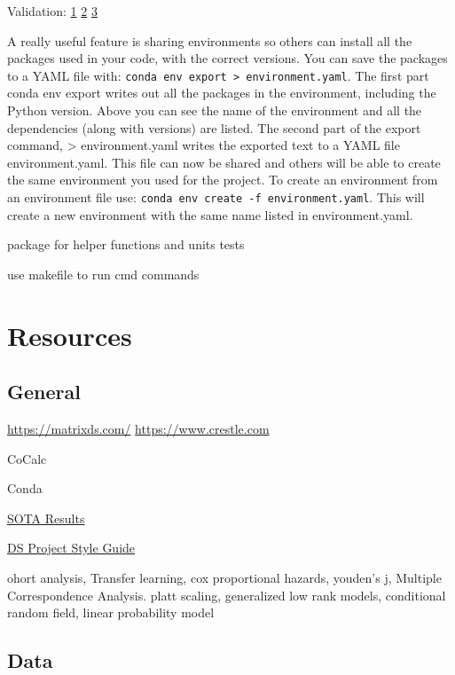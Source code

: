 \documentclass[]{book}
\begin{document}
Validation: \href{https://github.com/data-cleaning/validate}{1}
\textbar{} \href{https://rdrr.io/cran/checkmate/}{2} \textbar{}
\href{https://github.com/shawnbrown/datatest}{3}

A really useful feature is sharing environments so others can install
all the packages used in your code, with the correct versions. You can
save the packages to a YAML file with:
\texttt{conda\ env\ export\ \textgreater{}\ environment.yaml}. The first
part conda env export writes out all the packages in the environment,
including the Python version. Above you can see the name of the
environment and all the dependencies (along with versions) are listed.
The second part of the export command, \textgreater{} environment.yaml
writes the exported text to a YAML file environment.yaml. This file can
now be shared and others will be able to create the same environment you
used for the project. To create an environment from an environment file
use: \texttt{conda\ env\ create\ -f\ environment.yaml}. This will create
a new environment with the same name listed in environment.yaml.

package for helper functions and units tests

use makefile to run cmd commands

\section{Resources}\label{resources}

\subsection{General}\label{general}

\url{https://matrixds.com/} \textbar{} \url{https://www.crestle.com}

CoCalc

Conda

\href{https://paperswithcode.com/sota}{SOTA Results}

\href{https://www.dataquest.io/blog/data-science-project-style-guide/}{DS
Project Style Guide}

ohort analysis, Transfer learning, cox proportional hazards, youden's j,
Multiple Correspondence Analysis. platt scaling, generalized low rank
models, conditional random field, linear probability model

\subsection{Data}\label{data}
\end{document}
